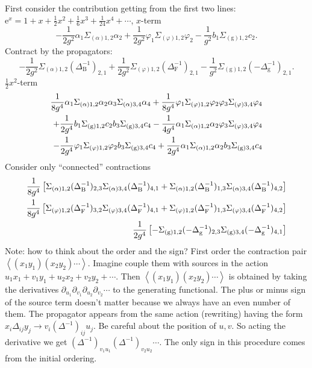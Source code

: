 First consider the contribution getting from the first two lines:
$ \mathrm{e}^x = 1 + x + \frac{1}{2}x^2 + \frac{1}{6}x^3 + \frac{1}{24}x^4 + \cdots$,
$x$-term
\[
	- \frac{1}{2g^2} \alpha_1 \Sigma_{(\alpha)1,2} \alpha_2
	+ \frac{1}{2g^2} \varphi_1 \Sigma_{(\varphi)1,2} \varphi_2
	- \frac{1}{g^2} b_1 \Sigma_{(\text{g})1,2} c_2
.\] 
Contract by the propagators:
\[
	- \frac{1}{2 g^2} \Sigma_{(\alpha)1,2} 
	(\Delta_{\mathrm{B}}^{-1})_{2,1}
	+ \frac{1}{2 g^2} \Sigma_{(\varphi)1,2}
	(\Delta_{\mathrm{F}}^{-1})_{2,1}
	- \frac{1}{g^2} \Sigma_{(\text{g})1,2}
	(-\Delta_{\mathrm{g}}^{-1})_{2,1}
.\] 
$\frac{1}{2}x^2$-term
\begin{align*}
	\frac{1}{8 g^4} \alpha_1 \Sigma_{(\alpha)1,2} \alpha_2
	\alpha_3 \Sigma_{(\alpha)3,4} \alpha_4
	+ \frac{1}{8 g^4} \varphi_1 \Sigma_{(\varphi)1,2} \varphi_2
	\varphi_3 \Sigma_{(\varphi)3,4} \varphi_4 \\
	+ \frac{1}{2g^4} b_1 \Sigma_{(\text{g})1,2} c_2
	b_3 \Sigma_{(\text{g})3,4} c_4
	-\frac{1}{4g^4} \alpha_1 \Sigma_{(\alpha)1,2} \alpha_2
	\varphi_3 \Sigma_{(\varphi)3,4} \varphi_4 \notag\\
	- \frac{1}{2 g^4} \varphi_1 \Sigma_{(\varphi)1,2} \varphi_2
	b_3 \Sigma_{(\text{g})3,4} c_4
	+ \frac{1}{2 g^4} \alpha_1 \Sigma_{(\alpha)1,2} \alpha_2
	b_3 \Sigma_{(\text{g})3,4} c_4
\end{align*}
Consider only ``connected'' contractions
\begin{align*}
	\frac{1}{8g^4}\left[
		\Sigma_{(\alpha)1,2} (\Delta_{\mathrm{B}}^{-1})_{2,3}
	\Sigma_{(\alpha)3,4} (\Delta_{\mathrm{B}}^{-1})_{4,1}
		+\Sigma_{(\alpha)1,2} (\Delta_{\mathrm{B}}^{-1})_{1,3}
	\Sigma_{(\alpha)3,4} (\Delta_{\mathrm{B}}^{-1})_{4,2}
\right] \notag \\
\frac{1}{8g^4} \left[
	\Sigma_{(\varphi)1,2} (\Delta_{\mathrm{F}}^{-1})_{3,2}
	\Sigma_{(\varphi)3,4} (\Delta_{\mathrm{F}}^{-1})_{4,1}
	+\Sigma_{(\varphi)1,2} (\Delta_{\mathrm{F}}^{-1})_{1,3}
	\Sigma_{(\varphi)3,4} (\Delta_{\mathrm{F}}^{-1})_{4,2}
\right] \notag \\
\frac{1}{2g^4}\left[
	- \Sigma_{(\text{g})1,2} (-\Delta_{\mathrm{g}}^{-1})_{2,3}
	\Sigma_{(\text{g})3,4} (-\Delta_{\mathrm{g}}^{-1})_{4,1}
\right]
\end{align*}
Note: how to think about the order and the sign?
First order the contraction pair $\left<(x_1 y_1)(x_2 y_2)\cdots \right>$.
Imagine couple them with sources in the action
$u_1 x_1 + v_1 y_1 + u_2 x_2 + v_2 y_2 + \cdots$.
Then $\left<(x_1 y_1) (x_2 y_2) \cdots \right>$ is obtained by taking the derivatives
$\partial_{u_1} \partial_{v_1} \partial_{u_2} \partial_{v_2} \cdots$ to the generating functional.
The plus or minus sign of the source term doesn't matter because we always have an even number of them.
The propagator appears from the same action (rewriting)
having the form $ x_i \Delta_{ij} y_j \to v_i (\Delta^{-1})_{ij} u_j$.
Be careful about the position of $u,v$.
So acting the derivative we get $(\Delta^{-1})_{v_1 u_1}
(\Delta^{-1})_{v_2 u_2}\cdots$.
The only sign in this procedure comes from the initial ordering.


